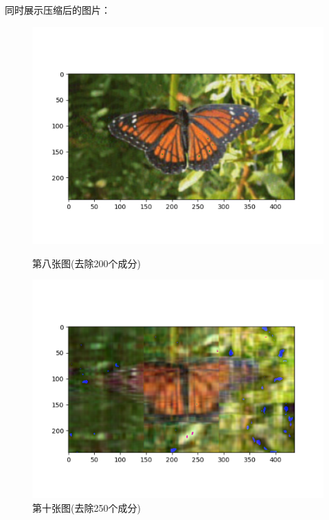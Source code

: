 \documentclass[UTF8]{ctexart}
\begin{document}
同时展示压缩后的图片：

\begin{figure}[htbp]
  \centering
  \begin{minipage}{0.4\textwidth}
    \centering
    \includegraphics[width=\textwidth]{6.png}
    \caption{第八张图(去除200个成分)}
    \label{fig:subfig1}
  \end{minipage}
  \hspace{1cm} %
  \begin{minipage}{0.4\textwidth}
    \centering
    \includegraphics[width=\textwidth]{9.png}
    \caption{第十张图(去除250个成分)}
    \label{fig:subfig2}
  \end{minipage}

  \label{fig:combined}
  \end{figure}
\end{document}
